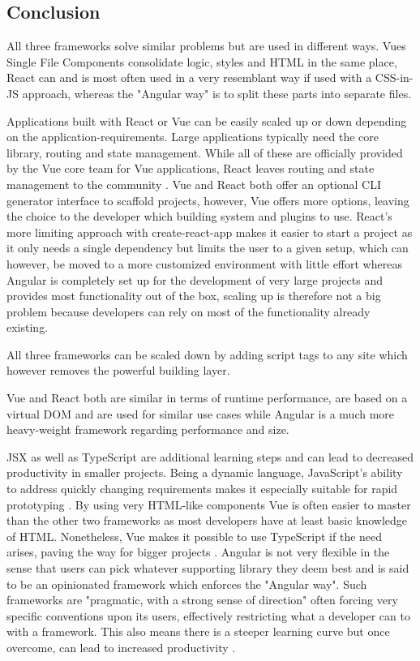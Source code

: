 \subsection{Conclusion}
All three frameworks solve similar problems but are used in different ways. Vues Single File Components consolidate logic, styles and HTML in the same place, React can and is most often used in a very resemblant way if used with a CSS-in-JS approach, whereas the "Angular way" is to split these parts into separate files. 

Applications built with React or Vue can be easily scaled up or down depending on the application-requirements. Large applications typically need the core library, routing and state management. While all of these are officially provided by the Vue core team for Vue applications, React leaves routing and state management to the community \cite{ComparisonVue:online}. Vue and React both offer an optional CLI generator interface to scaffold projects, however, Vue offers more options, leaving the choice to the developer which building system and plugins to use. React's more limiting approach with create-react-app makes it easier to start a project as it only needs a single dependency but limits the user to a given setup, which can however, be moved to a more customized environment with little effort whereas Angular is completely set up for the development of very large projects and provides most functionality out of the box, scaling up is therefore not a big problem because developers can rely on most of the functionality already existing.

All three frameworks can be scaled down by adding script tags to any site \cite{AddingReact:online, ComparisonVue:online} which however removes the powerful building layer.

Vue and React both are similar in terms of runtime performance, are based on a virtual DOM and are used for similar use cases while Angular is a much more heavy-weight framework regarding performance and size. 

JSX as well as TypeScript are additional learning steps and can lead to decreased productivity in smaller projects. Being a dynamic language, JavaScript's ability to address quickly changing requirements makes it especially suitable for rapid prototyping \cite[p.~72]{DynamicallyTypedLanguages:proceedings}. By using very HTML-like components Vue is often easier to master than the other two frameworks as most developers have at least basic knowledge of HTML. Nonetheless, Vue makes it possible to use TypeScript if the need arises, paving the way for bigger projects \cite{VueTypeScript:online}. Angular is not very flexible in the sense that users can pick whatever supporting library they deem best and is said to be an opinionated framework which enforces the "Angular way". Such frameworks are "pragmatic, with a strong sense of direction" \cite{Bedell:Opinionated:article} often forcing very specific conventions upon its users, effectively restricting what a developer can to with a framework. This also means there is a steeper learning curve but once overcome, can lead to increased productivity \cite{ComparisonVue:online}.


